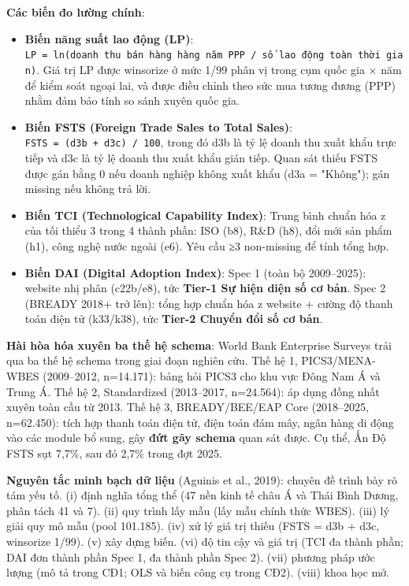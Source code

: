 \documentclass[12pt,a4paper]{article}
\begin{document}
\textbf{Các biến đo lường chính}:

\begin{itemize}
\item
  \textbf{Biến năng suất lao động (LP)}:
  \texttt{LP\ =\ ln(doanh\ thu\ bán\ hàng\ hàng\ năm\ PPP\ /\ số\ lao\ động\ toàn\ thời\ gian)}.
  Giá trị LP được winsorize ở mức 1/99 phân vị trong cụm quốc gia × năm
  để kiểm soát ngoại lai, và được điều chỉnh theo sức mua tương đương
  (PPP) nhằm đảm bảo tính so sánh xuyên quốc gia.
\item
  \textbf{Biến FSTS (Foreign Trade Sales to Total Sales)}:
  \texttt{FSTS\ =\ (d3b\ +\ d3c)\ /\ 100}, trong đó d3b là tỷ lệ doanh
  thu xuất khẩu trực tiếp và d3c là tỷ lệ doanh thu xuất khẩu gián tiếp.
  Quan sát thiếu FSTS được gán bằng 0 nếu doanh nghiệp không xuất khẩu
  (d3a = "Không"); gán missing nếu không trả lời.
\item
  \textbf{Biến TCI (Technological Capability Index)}: Trung bình chuẩn
  hóa z của tối thiểu 3 trong 4 thành phần: ISO (b8), R\&D (h8), đổi mới
  sản phẩm (h1), công nghệ nước ngoài (e6). Yêu cầu ≥3 non-missing để
  tính tổng hợp.
\item
  \textbf{Biến DAI (Digital Adoption Index)}: Spec 1 (toàn bộ
  2009--2025): website nhị phân (c22b/e8), tức \textbf{Tier-1 Sự hiện
  diện số cơ bản}. Spec 2 (BREADY 2018+ trở lên): tổng hợp chuẩn hóa z
  website + cường độ thanh toán điện tử (k33/k38), tức \textbf{Tier-2
  Chuyển đổi số cơ bản}.
\end{itemize}

\textbf{Hài hòa hóa xuyên ba thế hệ schema}: World Bank Enterprise
Surveys trải qua ba thế hệ schema trong giai đoạn nghiên cứu. Thế hệ 1,
PICS3/MENA-WBES (2009--2012, n=14.171): bảng hỏi PICS3 cho khu vực Đông
Nam Á và Trung Á. Thế hệ 2, Standardized (2013--2017, n=24.564): áp dụng
đồng nhất xuyên toàn cầu từ 2013. Thế hệ 3, BREADY/BEE/EAP Core
(2018--2025, n=62.450): tích hợp thanh toán điện tử, điện toán đám mây,
ngân hàng di động vào các module bổ sung, gây \textbf{đứt gãy schema}
quan sát được. Cụ thể, Ấn Độ FSTS sụt 7,7\%, sau đó 2,7\% trong đợt
2025.

\textbf{Nguyên tắc minh bạch dữ liệu} (Aguinis et al., 2019): chuyên đề
trình bày rõ tám yếu tố. (i) định nghĩa tổng thể (47 nền kinh tế châu Á
và Thái Bình Dương, phân tách 41 và 7). (ii) quy trình lấy mẫu (lấy mẫu
chính thức WBES). (iii) lý giải quy mô mẫu (pool 101.185). (iv) xử lý
giá trị thiếu (FSTS = d3b + d3c, winsorize 1/99). (v) xây dựng biến.
(vi) độ tin cậy và giá trị (TCI đa thành phần; DAI đơn thành phần Spec
1, đa thành phần Spec 2). (vii) phương pháp ước lượng (mô tả trong CĐ1;
OLS và biến công cụ trong CĐ2). (viii) khoa học mở.
\end{document}
